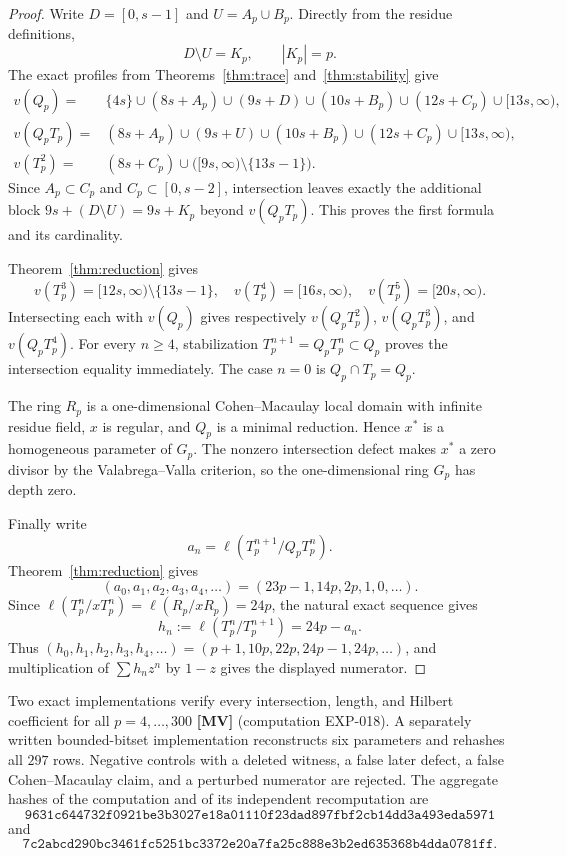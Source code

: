 \documentclass[11pt]{article}
\theoremstyle{definition}
\theoremstyle{remark}
\begin{document}
\begin{proof}
Write $D=[0,s-1]$ and $U=A_p\cup B_p$. Directly from the residue definitions,
\[
D\setminus U=K_p,\qquad |K_p|=p.
\]
The exact profiles from Theorems~\ref{thm:trace} and~\ref{thm:stability} give
\begin{align*}
v(Q_p)={}&\{4s\}\cup(8s+A_p)\cup(9s+D)\cup(10s+B_p)\cup(12s+C_p)
             \cup[13s,\infty),\\
v(Q_pT_p)={}&(8s+A_p)\cup(9s+U)\cup(10s+B_p)\cup(12s+C_p)
             \cup[13s,\infty),\\
v(T_p^2)={}&(8s+C_p)\cup\bigl([9s,\infty)\setminus\{13s-1\}\bigr).
\end{align*}
Since $A_p\subset C_p$ and $C_p\subset[0,s-2]$, intersection leaves exactly the additional
block $9s+(D\setminus U)=9s+K_p$ beyond $v(Q_pT_p)$. This proves the first formula and its
cardinality.

Theorem~\ref{thm:reduction} gives
\[
v(T_p^3)=[12s,\infty)\setminus\{13s-1\},\quad
v(T_p^4)=[16s,\infty),\quad v(T_p^5)=[20s,\infty).
\]
Intersecting each with $v(Q_p)$ gives respectively $v(Q_pT_p^2)$, $v(Q_pT_p^3)$, and
$v(Q_pT_p^4)$. For every $n\ge4$, stabilization
$T_p^{n+1}=Q_pT_p^n\subset Q_p$ proves the intersection equality immediately. The case $n=0$
is $Q_p\cap T_p=Q_p$.

The ring $R_p$ is a one-dimensional Cohen--Macaulay local domain with infinite residue field,
$x$ is regular, and $Q_p$ is a minimal reduction. Hence $x^*$ is a homogeneous parameter of
$G_p$. The nonzero intersection defect makes $x^*$ a zero divisor by the Valabrega--Valla
criterion, so the one-dimensional ring $G_p$ has depth zero.

Finally write
\[
a_n=\ell(T_p^{n+1}/Q_pT_p^n).
\]
Theorem~\ref{thm:reduction} gives
\[
(a_0,a_1,a_2,a_3,a_4,\ldots)=(23p-1,14p,2p,1,0,\ldots).
\]
Since $\ell(T_p^n/xT_p^n)=\ell(R_p/xR_p)=24p$, the natural exact sequence gives
\[
h_n:=\ell(T_p^n/T_p^{n+1})=24p-a_n.
\]
Thus $(h_0,h_1,h_2,h_3,h_4,\ldots)=(p+1,10p,22p,24p-1,24p,\ldots)$, and multiplication of
$\sum h_nz^n$ by $1-z$ gives the displayed numerator.
\end{proof}

Two exact implementations verify every intersection, length, and Hilbert coefficient for all
$p=4,\ldots,300$ \textbf{[MV]} (computation EXP-018). A separately written bounded-bitset
implementation reconstructs six parameters and rehashes all $297$ rows. Negative controls with a
deleted witness, a false later defect, a false Cohen--Macaulay claim, and a perturbed numerator
are rejected. The aggregate hashes of the computation and of its independent recomputation are
\[
\texttt{9631c644732f0921be3b3027e18a01110f23dad897fbf2cb14dd3a493eda5971}
\]
and
\[
\texttt{7c2abcd290bc3461fc5251bc3372e20a7fa25c888e3b2ed635368b4dda0781ff}.
\]
\end{document}
